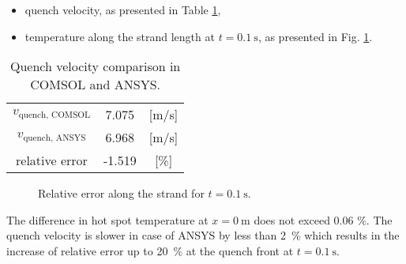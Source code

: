 \begin{itemize}
    \item quench velocity, as presented in Table \ref{table: 1d_no_insulation_v_quench_comparison},
    \item temperature along the strand length at $t=0.1~\text{s}$, as presented in Fig. \ref{fig: ans_comsol_comparison_rel_error_temp_f_2_2}.
\end{itemize}

\begin{table}[h!]
    \caption{Quench velocity comparison in COMSOL and ANSYS.} 
    \vspace{-1.em} 
    \fontsize{10}{10}
    \selectfont 
    \renewcommand{\arraystretch}{1.5}
    \begin{center}
        \begin{tabular}{ ccc }  
        \hline
        $v_\text{quench, COMSOL}$ & 7.075 & [m/s] \\
        $v_\text{quench, ANSYS}$ & 6.968 & [m/s] \\
        relative error & -1.519 & [\%] \\
        \hline 
        \end{tabular}
    \end{center}  
     \label{table: 1d_no_insulation_v_quench_comparison} 
 \end{table}

\begin{figure}[H]
\centering
    \caption{Relative error along the strand for $t=0.1~\text{s}$.}
    \label{fig: ans_comsol_comparison_rel_error_temp_f_2_2}
\end{figure}

The difference in hot spot temperature at $x=0~\text{m}$ does not exceed 0.06 \%. The quench velocity is slower in case of ANSYS by less than 2~\% which results in the increase of relative error up to 20~\% at the quench front at $t=0.1~\text{s}$.